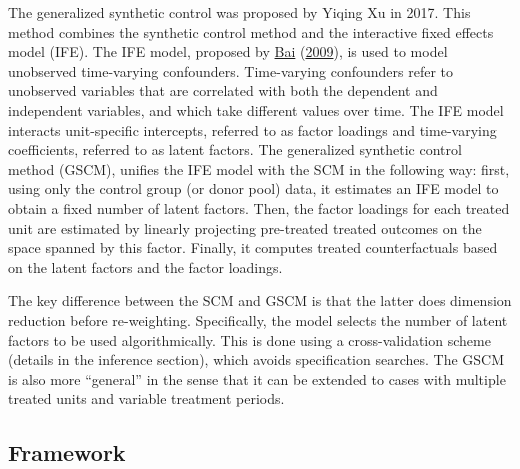\documentclass[12pt,nobind, a4paper]{reedthesis}
\begin{document}
 The generalized synthetic control was proposed by Yiqing Xu in 2017. This method combines the synthetic control method and the interactive fixed effects model (IFE). The IFE model, proposed by \protect\hyperlink{ref-bai_panel_2009}{Bai} (\protect\hyperlink{ref-bai_panel_2009}{2009}), is used to model unobserved time-varying confounders. Time-varying confounders refer to unobserved variables that are correlated with both the dependent and independent variables, and which take different values over time. The IFE model interacts unit-specific intercepts, referred to as factor loadings and time-varying coefficients, referred to as latent factors. The generalized synthetic control method (GSCM), unifies the IFE model with the SCM in the following way: first, using only the control group (or donor pool) data, it estimates an IFE model to obtain a fixed number of latent factors. Then, the factor loadings for each treated unit are estimated by linearly projecting pre-treated treated outcomes on the space spanned by this factor. Finally, it computes treated counterfactuals based on the latent factors and the factor loadings.
 \linebreak

 The key difference between the SCM and GSCM is that the latter does dimension reduction before re-weighting. Specifically, the model selects the number of latent factors to be used algorithmically. This is done using a cross-validation scheme (details in the inference section), which avoids specification searches. The GSCM is also more ``general'' in the sense that it can be extended to cases with multiple treated units and variable treatment periods.

 \hypertarget{framework}{%
 \subsection{Framework}\label{framework}}
\end{document}
